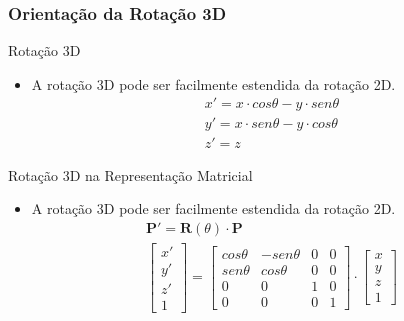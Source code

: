 \documentclass{beamer}
\begin{document}
\begin{frame}
\frametitle{Orientação da Rotação 3D}

	\begin{block}{Rotação 3D}
		\begin{itemize}
			\item A rotação 3D pode ser facilmente estendida da rotação 2D.
			\begin{eqnarray*}
				x' = x \cdot cos \theta - y \cdot sen \theta \\
				y' = x \cdot sen \theta - y \cdot cos \theta \\
				z' = z
			\end{eqnarray*}
		\end{itemize}
	\end{block}
	
	\begin{block}{Rotação 3D na Representação Matricial}
		\begin{itemize}
			\item A rotação 3D pode ser facilmente estendida da rotação 2D.
			\begin{eqnarray*}
				\textbf{P}' = \textbf{R}(\theta) \cdot \textbf{P}\\
				\begin{bmatrix}
					x'	\\
					y'	\\
					z'	\\
					1
				\end{bmatrix}
				= \begin{bmatrix}
					cos \theta	& -sen \theta	& 0 & 0 \\
					sen \theta	& cos \theta		& 0 & 0 \\
					0			& 0				& 1 & 0 \\
					0			& 0				& 0	& 1
				\end{bmatrix}
				\cdot \begin{bmatrix}
					x	\\
					y	\\
					z	\\
					1
				\end{bmatrix}
			\end{eqnarray*}
		\end{itemize}
	\end{block}
	
\end{frame}
\end{document}
